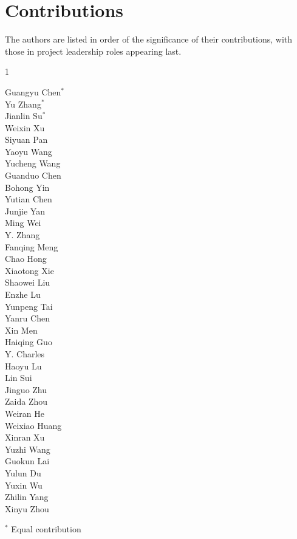 \section{Contributions}

The authors are listed in order of the significance of their contributions, with those in project leadership roles appearing last. 


\begin{multicols}{1}

Guangyu Chen$^*$\\
Yu Zhang$^*$\\
Jianlin Su$^*$\\
Weixin Xu\\
Siyuan Pan\\
Yaoyu Wang\\
Yucheng Wang\\
Guanduo Chen\\
Bohong Yin\\
Yutian Chen\\
Junjie Yan\\
Ming Wei\\
Y. Zhang\\
Fanqing Meng\\
Chao Hong\\
Xiaotong Xie\\
Shaowei Liu\\
Enzhe Lu\\
Yunpeng Tai\\
Yanru Chen\\
Xin Men\\
Haiqing Guo\\
Y. Charles\\
Haoyu Lu\\
Lin Sui\\
Jinguo Zhu\\
Zaida Zhou\\
Weiran He\\
Weixiao Huang\\
Xinran Xu\\
Yuzhi Wang\\
Guokun Lai\\
Yulun Du\\
Yuxin Wu\\
Zhilin Yang\\
Xinyu Zhou\\

\end{multicols}

$^*$ Equal contribution

\newpage